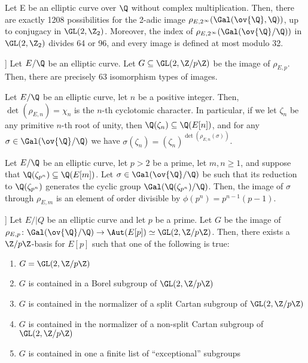 \begin{thm} %
Let E be an elliptic curve over $\Q$ without complex multiplication. Then, there are exactly 1208 possibilities for the 2-adic image $\rho_{E,2^\infty}(\Gal(\ov{\Q},\Q))$, up to conjugacy in $\GL(2,\Z_2)$. Moreover, the index of $\rho_{E,2^\infty}(\Gal(\ov{\Q}/\Q))$ in $\GL(2,\Z_2)$ divides 64 or 96, and every image is defined at most modulo 32.
\end{thm}


\begin{conj}[Sutherland, Zywina [26]]
Let $E/\Q$ be an elliptic curve. Let $G \subseteq \GL(2,\Z/p\Z)$ be the image of $\rho_{E,p}$. Then, there are precisely 63 isomorphism types of images. 
\end{conj}


\begin{prop} %
Let $E/\Q$ be an elliptic curve, let $n$ be a positive integer. Then, $\det(\rho_{E,n})= \chi_n$ is the $n$-th cyclotomic character. In particular, if we let $\zeta_n$ be any primitive $n$-th root of unity, then $\Q(\zeta_n) \subseteq \Q(E[n])$, and for any $\sigma \in \Gal(\ov{\Q}/\Q)$ we have $\sigma(\zeta_n)= (\zeta_n)^{\det(\rho_{E,n}(\sigma))}$. 
\end{prop}


\begin{cor} %
Let $E/\Q$ be an elliptic curve, let $p > 2$ be a prime, let $m,n \geq 1$, and suppose that $\Q(\zeta_{p^n}) \subseteq \Q(E[m])$. Let $\sigma \in \Gal(\ov{\Q}/\Q)$ be such that its reduction to $\Q(\zeta_{p^n})$ generates the cyclic group $\Gal(\Q(\zeta_{p^n})/\Q)$. Then, the image of $\sigma$ through $\rho_{E,m}$ is an element of order divisible by $\phi(p^n)= p^{n-1}(p - 1)$.
\end{cor}




\begin{prop}[[21]]
Let $E/|Q$ be an elliptic curve and let $p$ be a prime. Let $G$ be the image of $\rho_{E,p} \colon \Gal(\ov{\Q}/\Q) \to \Aut(E[p]) \simeq \GL(2,\Z/p\Z)$. Then, there exists a $\Z/p\Z$-basis for $E[p]$ such that one of the following is true:
	\begin{enumerate}[(1)]
	\item $G= \GL(2,\Z/p\Z)$
	\item $G$ is contained in a Borel subgroup of $\GL(2,\Z/p\Z)$
	\item $G$ is contained in the normalizer of a split Cartan subgroup of $\GL(2,\Z/p\Z)$
	\item $G$ is contained in the normalizer of a non-split Cartan subgroup of $\GL(2,\Z/p\Z)$
	\item $G$ is contained in one a finite list of ``exceptional'' subgroups
	\end{enumerate}
\end{prop}


